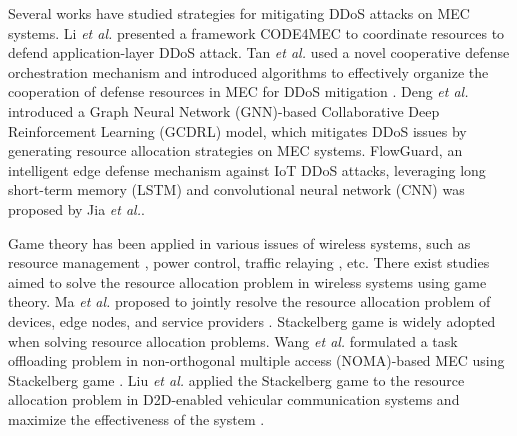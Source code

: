 \documentclass[10pt,journal, compsoc]{IEEEtran}
\begin{document}

Several works have studied strategies for mitigating DDoS attacks on MEC systems. Li \emph{et al.} presented a framework CODE4MEC to coordinate resources to defend application-layer DDoS attack\cite{Li2}. Tan \emph{et al.} used a novel cooperative defense orchestration mechanism and introduced algorithms to effectively organize the cooperation of defense resources in MEC for DDoS mitigation \cite{Tan}. Deng \emph{et al.} introduced a Graph Neural Network (GNN)-based Collaborative Deep Reinforcement Learning (GCDRL) model, which mitigates DDoS issues by generating resource allocation strategies on MEC systems\cite{Deng}. FlowGuard, an intelligent edge defense mechanism against IoT DDoS attacks, leveraging long short-term memory (LSTM) and convolutional neural network (CNN) \cite{Jia} was proposed by Jia \emph{et al.}.


Game theory has been applied in various issues of wireless systems, such as resource management \cite{Xu3}, power control\cite{Myung}, traffic relaying \cite{Li4}, etc. There exist studies aimed to solve the resource allocation problem in wireless systems using game theory. Ma \emph{et al.} proposed to jointly resolve the resource allocation problem of devices, edge nodes, and service providers \cite{Ma}. Stackelberg game is widely adopted when solving resource allocation problems. Wang \emph{et al.} formulated a task offloading problem in non-orthogonal multiple access (NOMA)-based MEC using Stackelberg game \cite{Wang2}. Liu \emph{et al.} applied the Stackelberg game to the resource allocation problem in D2D-enabled vehicular communication systems and maximize the effectiveness of the system \cite{Liu5}.
\end{document}
